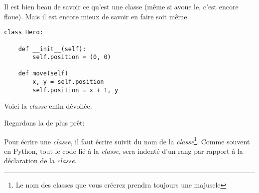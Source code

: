 Il est bien beau de savoir ce qu'est une classe (même si avoue le, c'est encore floue). Mais il est encore mieux de savoir en faire soit même.

\begin{lstlisting}
class Hero:

	def __init__(self):
		self.position = (0, 0)
		
	def move(self)
		x, y = self.position
		self.position = x + 1, y

\end{lstlisting}

Voici la \emph{classe}  enfin dévoilée.

Regardons la de plus prêt:

Pour écrire une \emph{classe}, il faut écrire  suivit du nom de la \emph{classe}\footnote{Le nom des classes que vous créerez prendra toujours une majuscle}.
Comme souvent en Python, tout le code lié à la \emph{classe}, sera indenté d'un rang par rapport à la déclaration de la \emph{classe}.